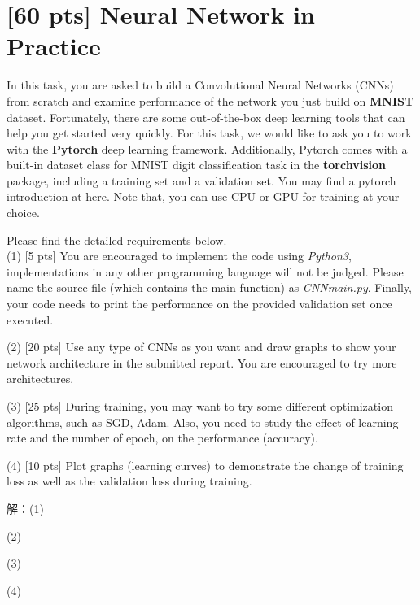 \documentclass{article}
\begin{document}
	\newpage
	\section{[60 pts] Neural Network in Practice}
	
	\noindent In this task, you are asked to build a Convolutional Neural Networks (CNNs) from scratch and examine performance of the network you just build on \textbf{MNIST} dataset.
	Fortunately, there are some out-of-the-box deep learning tools that can help you get started very quickly. For this task, we would like to ask you to work with the \textbf{Pytorch} deep learning framework. Additionally, Pytorch comes with a built-in dataset class for MNIST digit classification task in the \textbf{torchvision} package, including a training set and a validation set. You may find a pytorch introduction at \href{https://pytorch.org/tutorials/beginner/blitz/cifar10_tutorial.html}{here}. Note that, you can use CPU or GPU for training at your choice.
	
	Please find the detailed requirements below.\\

	(1) [5 pts] You are encouraged to implement the code using \emph{Python3}, implementations in any other programming language will not be judged. Please name the source file (which contains the main function) as \emph{CNN\underline{\hspace{0.5em}}main.py}. Finally, your code needs to print the performance on the provided validation set once executed.
		    
	(2) [20 pts] Use any type of CNNs as you want and draw graphs to show your network architecture in the submitted report. You are encouraged to try more architectures.
		    
	(3) [25 pts] During training, you may want to try some different optimization algorithms, such as SGD, Adam. Also, you need to study the effect of learning rate and the number of epoch, on the performance (accuracy).
		    
	(4) [10 pts] Plot graphs (learning curves) to demonstrate the change of training loss as well as the validation loss during training.

	\noindent 
	解：(1)

	\noindent 
	(2)

	\noindent 
	(3)

	\noindent 
	(4)



\begin{thebibliography}{1}
\end{thebibliography}
\end{document}
